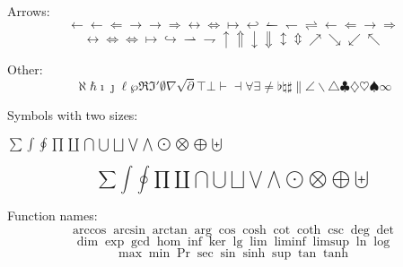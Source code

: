 
Arrows:
\begin{dmath}[compact,spread={1.250000\baselineskip}] \leftarrow \gets \Leftarrow \rightarrow \to \Rightarrow \leftrightarrow \Leftrightarrow \mapsto \hookleftarrow \leftharpoonup \leftharpoondown \rightleftharpoons \longleftarrow \Longleftarrow \longrightarrow \Longrightarrow  \end{dmath}
\begin{dmath}[compact,spread={1.250000\baselineskip}] \longleftrightarrow \Longleftrightarrow \iff \longmapsto \hookrightarrow \rightharpoonup \rightharpoondown \uparrow \Uparrow \downarrow \Downarrow \updownarrow \Updownarrow \nearrow \searrow \swarrow \nwarrow \end{dmath}

Other:
\begin{dmath}[compact,spread={1.250000\baselineskip}] \aleph \hbar \imath \jmath \ell \wp \Re \Im \prime \emptyset \nabla \surd \partial \top \bot \vdash \dashv \forall \exists \neq \flat \natural \sharp \| \angle \backslash \triangle \clubsuit \diamondsuit \heartsuit \spadesuit \infty \end{dmath}

Symbols with two sizes: 
\begin{center}
\(\sum \int \oint \prod \coprod \bigcap \bigcup \bigsqcup \bigvee \bigwedge \bigodot \bigotimes \bigoplus \biguplus\)
\end{center}
\begin{dmath}[compact,spread={1.250000\baselineskip}] \sum \int \oint \prod \coprod \bigcap \bigcup \bigsqcup \bigvee \bigwedge \bigodot \bigotimes \bigoplus \biguplus \end{dmath}

Function names:
\begin{dmath}[compact,spread={1.250000\baselineskip}] \arccos \arcsin \arctan \arg \cos \cosh \cot \coth \csc \deg \det  \end{dmath}
\begin{dmath}[compact,spread={1.250000\baselineskip}] \dim \exp \gcd \hom \inf \ker \lg \lim \liminf \limsup \ln \log  \end{dmath}
\begin{dmath}[compact,spread={1.250000\baselineskip}] \max \min \Pr \sec \sin \sinh \sup \tan \tanh \end{dmath}

